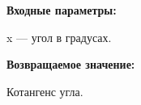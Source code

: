 \textbf{Входные параметры:}

 x --- угол в градусах.

\textbf{Возвращаемое значение:}

Котангенс угла.